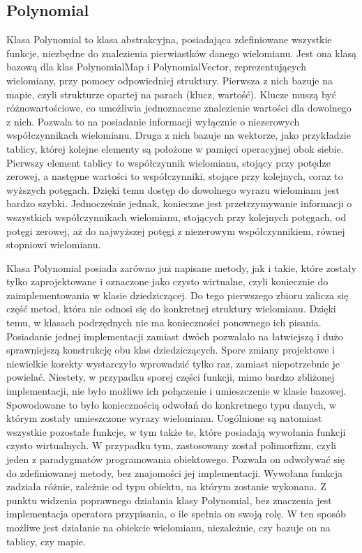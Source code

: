 \documentclass[oneside,a4paper]{book}
\begin{document}
	\subsection{Polynomial}
	
	Klasa Polynomial to klasa abstrakcyjna, posiadająca zdefiniowane wszystkie funkcje, niezbędne do znalezienia pierwiastków danego wielomianu. Jest ona klasą bazową dla klas PolynomialMap i PolynomialVector, reprezentujących wielomiany, przy pomocy odpowiedniej struktury. Pierwsza z nich bazuje na mapie, czyli strukturze opartej na parach (klucz, wartość). Klucze muszą być różnowartościowe, co umożliwia jednoznaczne znalezienie wartości dla dowolnego z nich. Pozwala to na posiadanie informacji wyłącznie o niezerowych współczynnikach wielomianu. Druga z nich bazuje na wektorze, jako przykładzie tablicy, której kolejne elementy są położone w pamięci operacyjnej obok siebie. Pierwszy element tablicy to współczynnik wielomianu, stojący przy potędze zerowej, a następne wartości to współczynniki, stojące przy kolejnych, coraz to wyższych potęgach. Dzięki temu dostęp do dowolnego wyrazu wielomianu jest bardzo szybki. Jednocześnie jednak, konieczne jest przetrzymywanie informacji o wszystkich współczynnikach wielomianu, stojących przy kolejnych potęgach, od potęgi zerowej, aż do najwyższej potęgi z niezerowym współczynnikiem, równej stopniowi wielomianu.
	
	Klasa Polynomial posiada zarówno już napisane metody, jak i takie, które zostały tylko zaprojektowane i oznaczone jako czysto wirtualne, czyli koniecznie do zaimplementowania w klasie dziedziczącej. Do tego pierwszego zbioru zalicza się część metod, która nie odnosi się do konkretnej struktury wielomianu. Dzięki temu, w klasach podrzędnych nie ma konieczności ponownego ich pisania. Posiadanie jednej implementacji zamiast dwóch pozwalało na łatwiejszą i dużo sprawniejszą konstrukcję obu klas dziedziczących. Spore zmiany projektowe i niewielkie korekty wystarczyło wprowadzić tylko raz, zamiast niepotrzebnie je powielać. Niestety, w przypadku sporej części funkcji, mimo bardzo zbliżonej implementacji, nie było możliwe ich połączenie i umieszczenie w klasie bazowej. Spowodowane to było koniecznością odwołań do konkretnego typu danych, w którym zostały umieszczone wyrazy wielomianu. Uogólnione są natomiast wszystkie pozostałe funkcje, w tym także te, które posiadają wywołania funkcji czysto wirtualnych. W przypadku tym, zastosowany został polimorfizm, czyli jeden z paradygmatów programowania obiektowego. Pozwala on odwoływać się do zdefiniowanej metody, bez znajomości jej implementacji. Wywołana funkcja zadziała różnie, zależnie od typu obiektu, na którym zostanie wykonana. Z punktu widzenia poprawnego działania klasy Polynomial, bez znaczenia jest implementacja operatora przypisania, o ile spełnia on swoją rolę. W ten sposób możliwe jest działanie na obiekcie wielomianu, niezależnie, czy bazuje on na tablicy, czy mapie.
	
\end{document}
